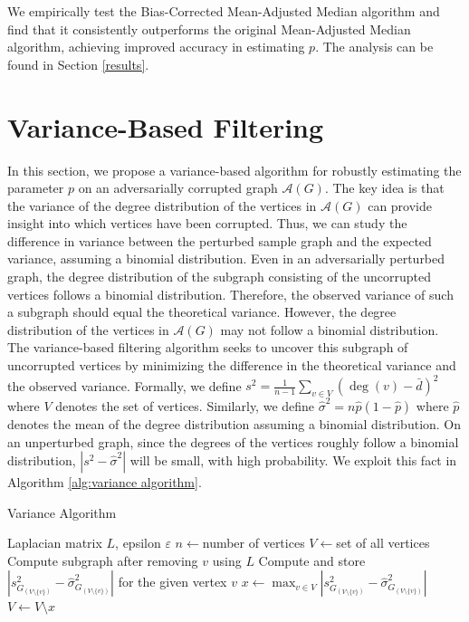 \documentclass[10pt,onecolumn,letterpaper]{article}
\let\epsilon\varepsilon
\begin{document}
We empirically test the Bias-Corrected Mean-Adjusted Median algorithm and find that it consistently outperforms the original Mean-Adjusted Median algorithm, achieving improved accuracy in estimating $p$. The analysis can be found in Section \ref{results}.



% 


\section{Variance-Based Filtering}
In this section, we propose a variance-based algorithm for robustly estimating the parameter $p$ on an adversarially corrupted graph \(\mathcal{A}(G)\). The key idea is that the variance of the degree distribution of the vertices in \(\mathcal{A}(G)\) can provide insight into which vertices have been corrupted. Thus, we can study the difference in variance between the perturbed sample graph and the expected variance, assuming a binomial distribution. Even in an adversarially perturbed graph, the degree distribution of the subgraph consisting of the uncorrupted vertices follows a binomial distribution. Therefore, the observed variance of such a subgraph should equal the theoretical variance. However, the degree distribution of the vertices in \(\mathcal{A}(G)\) may not follow a binomial distribution. The variance-based filtering algorithm seeks to uncover this subgraph of uncorrupted vertices by minimizing the difference in the theoretical variance and the observed variance. Formally, we define $s^2 = \frac{1}{n-1} \sum_{v \in V}{(\deg(v) - \bar{d})^2}$ where $V$ denotes the set of vertices. Similarly, we define $\hat{\sigma}^2 = n \hat{p} (1 - \hat{p})$ where $\hat{p}$ denotes the mean of the degree distribution assuming a binomial distribution. On an unperturbed graph, since the degrees of the vertices roughly follow a binomial distribution, $\left| s^2 - \hat{\sigma}^2 \right|$ will be small, with high probability. We exploit this fact in Algorithm \ref{alg:variance algorithm}.

\begin{algorithm}
\caption{Variance Algorithm}\label{alg:variance algorithm}
\begin{algorithmic}
\Require Laplacian matrix $L$, epsilon $\epsilon$
\State $n \gets $number of vertices
\State $V \gets $set of all vertices
\While{$t = 0, t < \epsilon n$}
\State Compute subgraph after removing $v$ using $L$
\State Compute and store $\left| s^2_{G_{(V \setminus \{v\})}} - \hat{\sigma}^2_{G_{(V \setminus \{v\})}} \right|$ for the given vertex $v$
\EndFor
\State $x \gets \max_{v \in V} \left| s^2_{G_{(V \setminus \{v\})}} - \hat{\sigma}^2_{G_{(V \setminus \{v\})}} \right|$
\State $V \gets V \setminus x$
\EndWhile
\end{algorithmic}
\end{algorithm}
\end{document}
